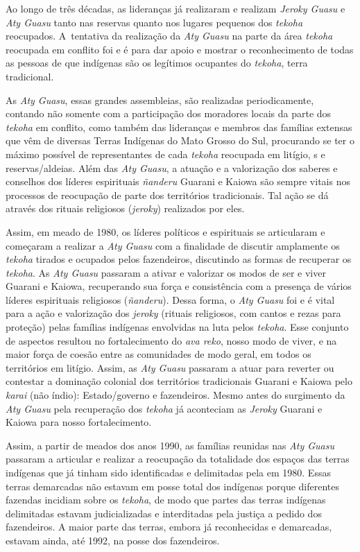Ao longo de três décadas, as lideranças já realizaram e realizam \emph{Jeroky
Guasu} e \emph{Aty Guasu} tanto nas reservas quanto nos lugares pequenos dos
\emph{tekoha} reocupados. A~tentativa da realização da \emph{Aty Guasu} na parte da
área \emph{tekoha} reocupada em conflito foi e é para dar apoio e mostrar o
reconhecimento de todas as pessoas de que indígenas são os legítimos
ocupantes do \emph{tekoha}, terra tradicional. 

As \emph{Aty Guasu}, essas grandes assembleias, são realizadas periodicamente,
contando não somente com a participação dos moradores locais da parte
dos \emph{tekoha} em conflito, como também das lideranças e membros das
famílias extensas que vêm de diversas Terras Indígenas do Mato Grosso
do Sul, procurando se ter o máximo possível de representantes de cada
\emph{tekoha} reocupada em litígio, s e reservas/aldeias. Além das \emph{Aty
Guasu}, a atuação e a valorização dos saberes e conselhos dos líderes
espirituais \emph{ñanderu} Guarani e Kaiowa são sempre vitais nos processos de
reocupação de parte dos territórios tradicionais. Tal ação se dá
através dos rituais religiosos (\emph{jeroky}) realizados por eles.

Assim, em meado de 1980, os líderes políticos e espirituais se
articularam e começaram a realizar a \emph{Aty Guasu} com a finalidade de
discutir amplamente os \emph{tekoha} tirados e ocupados pelos fazendeiros,
discutindo as formas de recuperar os \emph{tekoha}. As \emph{Aty Guasu} passaram a
ativar e valorizar os modos de ser e viver Guarani e Kaiowa,
recuperando sua força e consistência com a presença de vários líderes
espirituais religiosos (\emph{ñanderu}). Dessa forma, o \emph{Aty Guasu} foi e é
vital para a ação e valorização dos \emph{jeroky} (rituais religiosos, com
cantos e rezas para proteção) pelas famílias indígenas envolvidas na
luta pelos \emph{tekoha}. Esse conjunto de aspectos resultou no fortalecimento
do \emph{ava reko}, nosso modo de viver, e na maior força de coesão entre as
comunidades de modo geral, em todos os territórios em litígio. Assim,
as \emph{Aty Guasu} passaram a atuar para reverter ou contestar a dominação
colonial dos territórios tradicionais Guarani e Kaiowa pelo \emph{karai} (não
índio): Estado/governo e fazendeiros. Mesmo antes do surgimento da \emph{Aty
Guasu} pela recuperação dos \emph{tekoha} já aconteciam as \emph{Jeroky} Guarani e
Kaiowa para nosso fortalecimento.

Assim, a partir de meados dos anos 1990, as famílias reunidas nas \emph{Aty
Guasu} passaram a articular e realizar a reocupação da totalidade dos
espaços das terras indígenas que já tinham sido identificadas e
delimitadas pela  em 1980. Essas terras demarcadas não estavam em
posse total dos indígenas porque diferentes fazendas incidiam sobre os
\emph{tekoha}, de modo que partes das terras indígenas delimitadas estavam
judicializadas e interditadas pela justiça a pedido dos fazendeiros. A
maior parte das terras, embora já reconhecidas e demarcadas, estavam
ainda, até 1992, na posse dos fazendeiros. 

